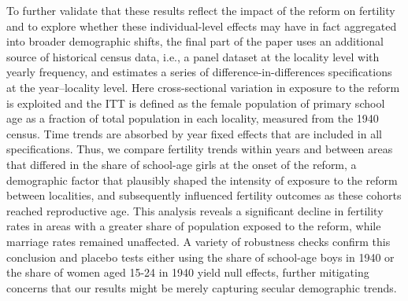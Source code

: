 \documentclass[a4paper,oneside,final,onecolumn,12pt,english]{article}
\begin{document}
To further validate that these results reflect the impact of the reform on fertility and to explore whether these individual-level effects may have in fact aggregated into broader demographic shifts, the final part of the paper uses an additional source of historical census data, i.e., a panel dataset at the locality level with yearly frequency, and estimates a series of difference-in-differences specifications at the year–locality level. Here cross-sectional variation in exposure to the reform is exploited and the ITT is defined as the female population of primary school age as a fraction of total population in each locality, measured from the 1940 census. Time trends are absorbed by year fixed effects that are included in all specifications. Thus, we compare fertility trends within years and between areas that differed in the share of school-age girls at the onset of the reform, a demographic factor that plausibly shaped the intensity of exposure to the reform between localities, and subsequently influenced fertility outcomes as these cohorts reached reproductive age. This analysis reveals a significant decline in fertility rates in areas with a greater share of population exposed to the reform, while marriage rates remained unaffected. A variety of robustness checks confirm this conclusion and placebo tests either using the share of school-age boys in 1940 or the share of women aged 15-24 in 1940 yield null effects, further mitigating concerns that our results might be merely capturing secular demographic trends.
\end{document}
